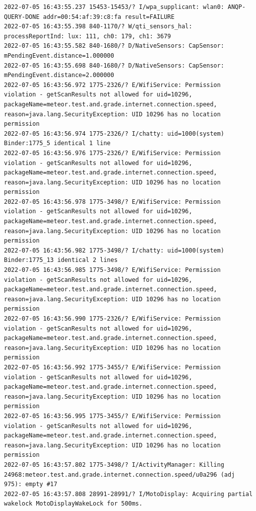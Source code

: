 \documentclass[a4paper,12pt]{book}
\begin{document}
\begin{lstlisting}
2022-07-05 16:43:55.237 15453-15453/? I/wpa_supplicant: wlan0: ANQP-QUERY-DONE addr=00:54:af:39:c8:fa result=FAILURE
2022-07-05 16:43:55.398 840-1170/? W/qti_sensors_hal: processReportInd: lux: 111, ch0: 179, ch1: 3679
2022-07-05 16:43:55.582 840-1680/? D/NativeSensors: CapSensor:  mPendingEvent.distance=1.000000
2022-07-05 16:43:55.698 840-1680/? D/NativeSensors: CapSensor:  mPendingEvent.distance=2.000000
2022-07-05 16:43:56.972 1775-2326/? E/WifiService: Permission violation - getScanResults not allowed for uid=10296, packageName=meteor.test.and.grade.internet.connection.speed, reason=java.lang.SecurityException: UID 10296 has no location permission
2022-07-05 16:43:56.974 1775-2326/? I/chatty: uid=1000(system) Binder:1775_5 identical 1 line
2022-07-05 16:43:56.976 1775-2326/? E/WifiService: Permission violation - getScanResults not allowed for uid=10296, packageName=meteor.test.and.grade.internet.connection.speed, reason=java.lang.SecurityException: UID 10296 has no location permission
2022-07-05 16:43:56.978 1775-3498/? E/WifiService: Permission violation - getScanResults not allowed for uid=10296, packageName=meteor.test.and.grade.internet.connection.speed, reason=java.lang.SecurityException: UID 10296 has no location permission
2022-07-05 16:43:56.982 1775-3498/? I/chatty: uid=1000(system) Binder:1775_13 identical 2 lines
2022-07-05 16:43:56.985 1775-3498/? E/WifiService: Permission violation - getScanResults not allowed for uid=10296, packageName=meteor.test.and.grade.internet.connection.speed, reason=java.lang.SecurityException: UID 10296 has no location permission
2022-07-05 16:43:56.990 1775-2326/? E/WifiService: Permission violation - getScanResults not allowed for uid=10296, packageName=meteor.test.and.grade.internet.connection.speed, reason=java.lang.SecurityException: UID 10296 has no location permission
2022-07-05 16:43:56.992 1775-3455/? E/WifiService: Permission violation - getScanResults not allowed for uid=10296, packageName=meteor.test.and.grade.internet.connection.speed, reason=java.lang.SecurityException: UID 10296 has no location permission
2022-07-05 16:43:56.995 1775-3455/? E/WifiService: Permission violation - getScanResults not allowed for uid=10296, packageName=meteor.test.and.grade.internet.connection.speed, reason=java.lang.SecurityException: UID 10296 has no location permission
2022-07-05 16:43:57.802 1775-3498/? I/ActivityManager: Killing 24968:meteor.test.and.grade.internet.connection.speed/u0a296 (adj 975): empty #17
2022-07-05 16:43:57.808 28991-28991/? I/MotoDisplay: Acquiring partial wakelock MotoDisplayWakeLock for 500ms.

\end{lstlisting}
\end{document}
